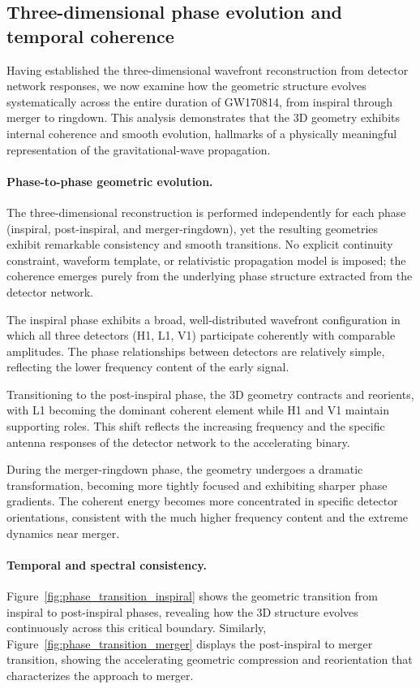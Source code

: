 \documentclass[11pt,a4paper]{article}
\begin{document}
\subsection{Three-dimensional phase evolution and temporal coherence}
\label{sec:multi_phase_convergence}

Having established the three-dimensional wavefront reconstruction from detector network
responses, we now examine how the geometric structure evolves systematically across
the entire duration of GW170814, from inspiral through merger to ringdown.
This analysis demonstrates that the 3D geometry exhibits internal coherence and smooth
evolution, hallmarks of a physically meaningful representation of the gravitational-wave
propagation.

\paragraph{Phase-to-phase geometric evolution.}
The three-dimensional reconstruction is performed independently for each phase (inspiral,
post-inspiral, and merger-ringdown), yet the resulting geometries exhibit remarkable
consistency and smooth transitions.
No explicit continuity constraint, waveform template, or relativistic propagation model
is imposed; the coherence emerges purely from the underlying phase structure extracted
from the detector network.

The inspiral phase exhibits a broad, well-distributed wavefront configuration in which
all three detectors (H1, L1, V1) participate coherently with comparable amplitudes.
The phase relationships between detectors are relatively simple, reflecting the lower
frequency content of the early signal.

Transitioning to the post-inspiral phase, the 3D geometry contracts and reorients,
with L1 becoming the dominant coherent element while H1 and V1 maintain supporting
roles. This shift reflects the increasing frequency and the specific antenna responses
of the detector network to the accelerating binary.

During the merger-ringdown phase, the geometry undergoes a dramatic transformation,
becoming more tightly focused and exhibiting sharper phase gradients. The coherent
energy becomes more concentrated in specific detector orientations, consistent with
the much higher frequency content and the extreme dynamics near merger.

\paragraph{Temporal and spectral consistency.}
Figure~\ref{fig:phase_transition_inspiral} shows the geometric transition from inspiral
to post-inspiral phases, revealing how the 3D structure evolves continuously across
this critical boundary.
Similarly, Figure~\ref{fig:phase_transition_merger} displays the post-inspiral to
merger transition, showing the accelerating geometric compression and reorientation
that characterizes the approach to merger.
\end{document}
